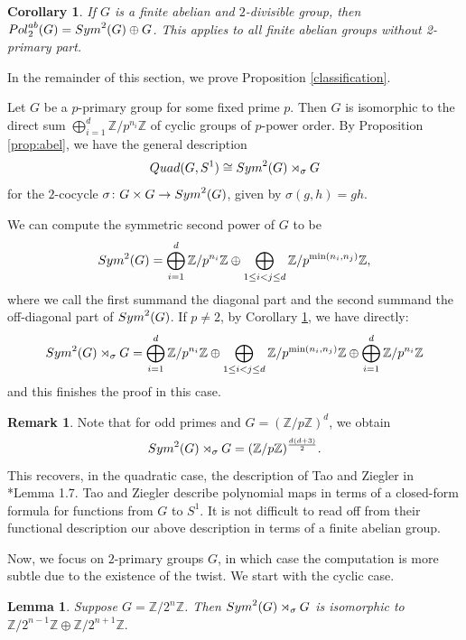 \documentclass[a4paper,11pt]{amsproc}
\theoremstyle{plain}
\newtheorem{lemma}[theorem]{Lemma}
\newtheorem{corollary}[theorem]{Corollary}
\theoremstyle{definition}
\newtheorem{remark}[theorem]{Remark}
\begin{document}
\begin{corollary} \label{cor-split}
If $G$ is a finite abelian and $2$-divisible group, then ${\rm Pol}_2^{ab}(G)= {\rm Sym}^2(G) \oplus G$. This applies to all finite abelian groups without 2-primary part.
\end{corollary}


In the remainder of this section, we prove Proposition \ref{classification}. 

Let $G$ be a $p$-primary group for some fixed prime $p$.  
Then $G$ is isomorphic to the direct sum $\bigoplus_{i=1}^d \mathbb{Z}/p^{n_i}\mathbb{Z}$ of cyclic groups of $p$-power order. By Proposition \ref{prop:abel}, we have the general description
\[
{\rm Quad}(G,S^1) \cong {\rm Sym}^2(G)\rtimes_\sigma G
\]
for the $2$-cocycle $\sigma\colon G\times G\to {\rm Sym}^2(G)$, given by $\sigma(g,h)=gh$. 

We can compute the symmetric second power of $G$ to be  
\[
{\rm Sym}^2(G) =  \bigoplus_{i=1}^d \mathbb{Z}/p^{n_i}\mathbb{Z} \oplus \bigoplus_{1\leq i<j\leq d} \mathbb{Z}/p^{\min(n_i,n_j)}\mathbb{Z},
\]
where we call the first summand the diagonal part and the second summand the off-diagonal part of ${\rm Sym}^2(G)$.
If $p\neq 2$, by Corollary \ref{cor-split}, we have directly:
\[
{\rm Sym}^2(G)\rtimes_\sigma G = \bigoplus_{i=1}^d \mathbb{Z}/p^{n_i}\mathbb{Z} \oplus \bigoplus_{1\leq i<j\leq d} \mathbb{Z}/p^{\min(n_i,n_j)}\mathbb{Z} \oplus \bigoplus_{i=1}^d \mathbb{Z}/p^{n_i}\mathbb{Z}
\] and this finishes the proof in this case.

\begin{remark}\label{tz}
Note that for odd primes and $G=(\mathbb{Z}/p\mathbb{Z})^d$, we obtain 
\[
{\rm Sym}^2(G)\rtimes_\sigma G = (\mathbb{Z}/p\mathbb{Z})^{\frac{d(d+3)}{2}}.
\]
This recovers, in the quadratic case, the description of Tao and Ziegler in \cite{tz2}*{Lemma 1.7}. Tao and Ziegler describe polynomial maps in terms of a closed-form formula for functions from $G$ to $S^1$. It is not difficult to read off from their functional description our above description in terms of a finite abelian group. 
\end{remark}

Now, we focus on $2$-primary groups $G$, in which case the computation is more subtle due to the existence of the twist. We start with the cyclic case. 

\begin{lemma}\label{lemB}
    Suppose $G=\mathbb{Z}/2^n\mathbb{Z}$. Then
    $
    {\rm Sym}^2(G)\rtimes_\sigma G 
    $
    is isomorphic to 
    $
    \mathbb{Z}/2^{n-1}\mathbb{Z} \oplus \mathbb{Z}/2^{n+1}\mathbb{Z}.
    $
\end{lemma}
\end{document}
